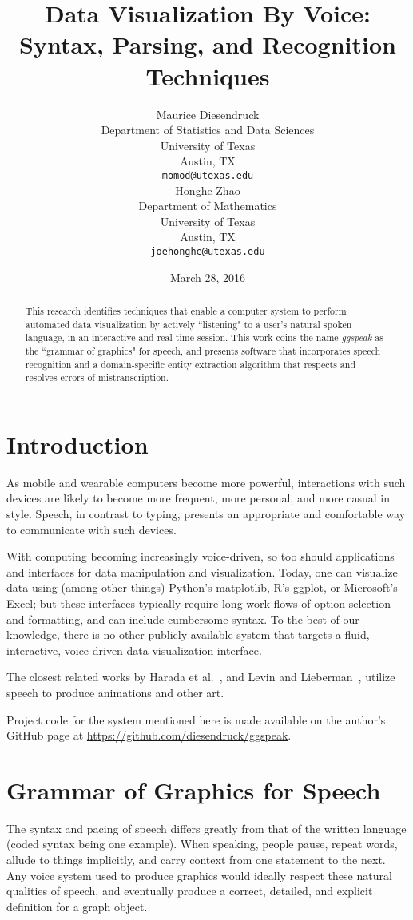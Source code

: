 \documentclass[11pt]{article}
\title{Data Visualization By Voice: Syntax, Parsing, and Recognition Techniques}
\author{Maurice Diesendruck \\
  Department of Statistics and Data Sciences\\
  University of Texas \\
  Austin, TX \\
  {\tt momod@utexas.edu} 
  \\\And
  Honghe Zhao \\
  Department of Mathematics\\
  University of Texas \\
  Austin, TX \\
  {\tt joehonghe@utexas.edu} \\
  }
\date{March 28, 2016}
\begin{document}
\maketitle
\begin{abstract} 
  This research identifies techniques that enable a computer system to perform automated data 
  visualization by actively ``listening" to a user's natural spoken language, in an interactive 
  and real-time session. This work coins the name \textit{ggspeak} as the ``grammar of 
  graphics" for speech, and presents software that incorporates speech recognition and
  a domain-specific entity extraction algorithm that respects and resolves errors of
  mistranscription.
\end{abstract}

\section{Introduction}
As mobile and wearable computers become more powerful, interactions with such
devices are likely to become more frequent, more personal, and more casual
in style. Speech, in contrast to typing, presents an appropriate and comfortable way to
communicate with such devices. 

With computing becoming increasingly voice-driven, so too should applications and interfaces for data manipulation and visualization. Today, one can visualize data using (among other 
things) Python's matplotlib, R's ggplot, or Microsoft's Excel; but these interfaces typically 
require long work-flows of option selection and formatting, and can include cumbersome syntax. 
To the best of our knowledge, there is no other publicly available system that targets
a fluid, interactive, voice-driven data visualization interface.

The closest related works by Harada et al.~, and Levin and
Lieberman~, utilize speech to produce animations and other art.

Project code for the system mentioned here is made available on the author's GitHub page at
\url{https://github.com/diesendruck/ggspeak}.

\section{Grammar of Graphics for Speech}
The syntax and pacing of speech differs greatly from that of the written language (coded syntax being one example). When speaking, people pause, repeat words, allude to things implicitly, and carry context from one statement to the next. Any voice system used to produce graphics would ideally respect these natural qualities of speech, and eventually produce a correct, detailed, and explicit definition for a graph object.
\end{document}
